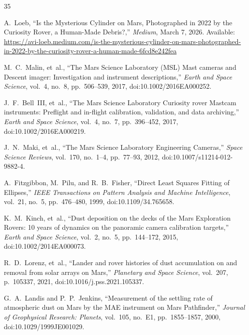 \documentclass[11pt,a4paper]{article}
\begin{document}
\begin{thebibliography}{35}\footnotesize\setlength{\itemsep}{0.5pt}\setlength{\parskip}{0pt}

	A.~Loeb, ``Is the Mysterious Cylinder on Mars, Photographed in 2022 by the Curiosity Rover, a Human-Made Debris?,'' \textit{Medium}, March 7, 2026. Available: \url{https://avi-loeb.medium.com/is-the-mysterious-cylinder-on-mars-photographed-in-2022-by-the-curiosity-rover-a-human-made-6fcd8e242fea}

	M.~C.~Malin, et~al., ``The Mars Science Laboratory (MSL) Mast cameras and Descent imager: Investigation and instrument descriptions,'' \textit{Earth and Space Science}, vol.~4, no.~8, pp.~506--539, 2017, doi:10.1002/2016EA000252.

	J.~F.~Bell~III, et~al., ``The Mars Science Laboratory Curiosity rover Mastcam instruments: Preflight and in-flight calibration, validation, and data archiving,'' \textit{Earth and Space Science}, vol.~4, no.~7, pp.~396--452, 2017, doi:10.1002/2016EA000219.

	J.~N.~Maki, et~al., ``The Mars Science Laboratory Engineering Cameras,'' \textit{Space Science Reviews}, vol.~170, no.~1--4, pp.~77--93, 2012, doi:10.1007/s11214-012-9882-4.

	A.~Fitzgibbon, M.~Pilu, and R.~B.~Fisher, ``Direct Least Squares Fitting of Ellipses,'' \textit{IEEE Transactions on Pattern Analysis and Machine Intelligence}, vol.~21, no.~5, pp.~476--480, 1999, doi:10.1109/34.765658.

	K.~M.~Kinch, et~al., ``Dust deposition on the decks of the Mars Exploration Rovers: 10 years of dynamics on the panoramic camera calibration targets,'' \textit{Earth and Space Science}, vol.~2, no.~5, pp.~144--172, 2015, doi:10.1002/2014EA000073.

	R.~D.~Lorenz, et~al., ``Lander and rover histories of dust accumulation on and removal from solar arrays on Mars,'' \textit{Planetary and Space Science}, vol.~207, p.~105337, 2021, doi:10.1016/j.pss.2021.105337.

	G.~A.~Landis and P.~P.~Jenkins, ``Measurement of the settling rate of atmospheric dust on Mars by the MAE instrument on Mars Pathfinder,'' \textit{Journal of Geophysical Research: Planets}, vol.~105, no.~E1, pp.~1855--1857, 2000, doi:10.1029/1999JE001029.


\end{thebibliography}
\end{document}
